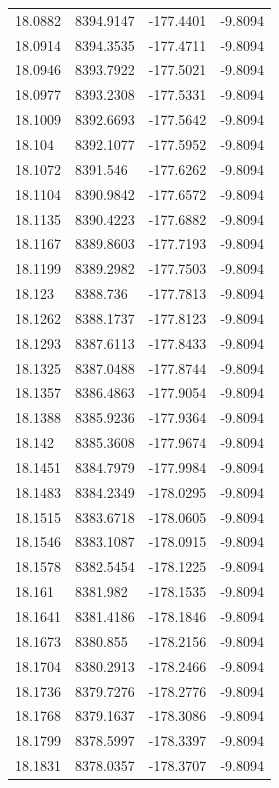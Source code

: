 \begin{table}[H]
\begin{tabular}{llll}
18.0882 & 8394.9147 & -177.4401 & -9.8094 \\
18.0914 & 8394.3535 & -177.4711 & -9.8094 \\
18.0946 & 8393.7922 & -177.5021 & -9.8094 \\
18.0977 & 8393.2308 & -177.5331 & -9.8094 \\
18.1009 & 8392.6693 & -177.5642 & -9.8094 \\
18.104 & 8392.1077 & -177.5952 & -9.8094 \\
18.1072 & 8391.546 & -177.6262 & -9.8094 \\
18.1104 & 8390.9842 & -177.6572 & -9.8094 \\
18.1135 & 8390.4223 & -177.6882 & -9.8094 \\
18.1167 & 8389.8603 & -177.7193 & -9.8094 \\
18.1199 & 8389.2982 & -177.7503 & -9.8094 \\
18.123 & 8388.736 & -177.7813 & -9.8094 \\
18.1262 & 8388.1737 & -177.8123 & -9.8094 \\
18.1293 & 8387.6113 & -177.8433 & -9.8094 \\
18.1325 & 8387.0488 & -177.8744 & -9.8094 \\
18.1357 & 8386.4863 & -177.9054 & -9.8094 \\
18.1388 & 8385.9236 & -177.9364 & -9.8094 \\
18.142 & 8385.3608 & -177.9674 & -9.8094 \\
18.1451 & 8384.7979 & -177.9984 & -9.8094 \\
18.1483 & 8384.2349 & -178.0295 & -9.8094 \\
18.1515 & 8383.6718 & -178.0605 & -9.8094 \\
18.1546 & 8383.1087 & -178.0915 & -9.8094 \\
18.1578 & 8382.5454 & -178.1225 & -9.8094 \\
18.161 & 8381.982 & -178.1535 & -9.8094 \\
18.1641 & 8381.4186 & -178.1846 & -9.8094 \\
18.1673 & 8380.855 & -178.2156 & -9.8094 \\
18.1704 & 8380.2913 & -178.2466 & -9.8094 \\
18.1736 & 8379.7276 & -178.2776 & -9.8094 \\
18.1768 & 8379.1637 & -178.3086 & -9.8094 \\
18.1799 & 8378.5997 & -178.3397 & -9.8094 \\
18.1831 & 8378.0357 & -178.3707 & -9.8094 \\

\end{tabular}
\end{table}
